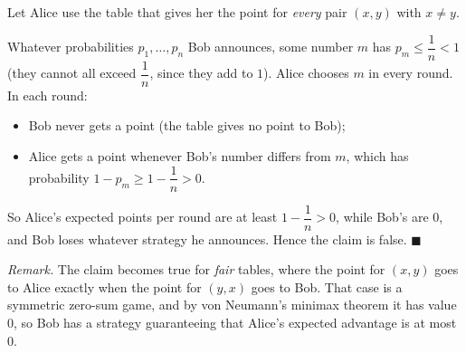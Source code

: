 Let Alice use the table that gives her the point for \emph{every} pair $(x,y)$ with $x\ne y$.

Whatever probabilities $p_1,\dots,p_n$ Bob announces, some number $m$ has $p_m\le\dfrac{1}{n}<1$ (they cannot all exceed $\dfrac{1}{n}$, since they add to $1$). Alice chooses $m$ in every round. In each round:
\begin{itemize}
\item Bob never gets a point (the table gives no point to Bob);
\item Alice gets a point whenever Bob's number differs from $m$, which has probability $1-p_m\ge1-\dfrac{1}{n}>0$.
\end{itemize}
So Alice's expected points per round are at least $1-\dfrac{1}{n}>0$, while Bob's are $0$, and Bob loses whatever strategy he announces. Hence the claim is false. $\blacksquare$

\emph{Remark.} The claim becomes true for \emph{fair} tables, where the point for $(x,y)$ goes to Alice exactly when the point for $(y,x)$ goes to Bob. That case is a symmetric zero-sum game, and by von Neumann's minimax theorem it has value $0$, so Bob has a strategy guaranteeing that Alice's expected advantage is at most $0$.
